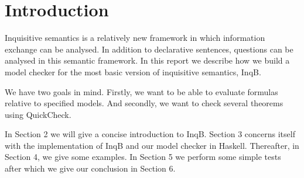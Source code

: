 \section{Introduction}\label{sec: Introduction}
Inquisitive semantics is a relatively new framework in which information exchange can be analysed. In addition to declarative sentences, questions can be analysed in this semantic framework. In this report we describe how we build a model checker for the most basic version of inquisitive semantics, \textsf{InqB}.

We have two goals in mind. Firstly, we want to be able to evaluate formulas relative to specified models. And secondly, we want to check several theorems using QuickCheck.

In Section 2 we will give a concise introduction to \textsf{InqB}. Section 3 concerns itself with the implementation of \textsf{InqB} and our model checker in Haskell. Thereafter, in Section 4, we give some examples. In Section 5 we perform some simple tests after which we give our conclusion in Section 6.

